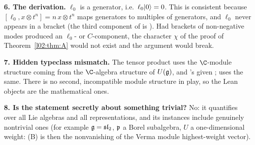 \begin{warning}
\textbf{6. The derivation.} $\ell_0$ is a generator, i.e.\ $\ell_0|0\rangle=0$. This is consistent
because $[\ell_0, x\otimes t^n] = n\,x\otimes t^n$ maps generators to multiples of generators, and $\ell_0$
never appears in a bracket (the third component of  is ). Had brackets of
non-negative modes produced an $\ell_0$- or $C$-component, the character $\chi$ of the proof of
Theorem~\ref{l02:thm:A} would not exist and the argument would break.

\textbf{7. Hidden typeclass mismatch.} The tensor product 
uses the $\C$-module structure coming from the $\C$-algebra structure of $U(\mathfrak{g})$, and 's given
\lean{[Module ℂ U]};  uses the same. There is no second, incompatible module
structure in play, so the Lean objects are the mathematical ones.

\textbf{8. Is the statement secretly about something trivial?} No: it quantifies over all Lie
algebras and all representations, and its instances include genuinely nontrivial ones (for example
$\mathfrak{g} = \mathfrak{sl}_2$, $\mathfrak{p}$ a Borel subalgebra, $U$ a one-dimensional weight: (B) is then the
nonvanishing of the Verma module highest-weight vector).
\end{warning}

